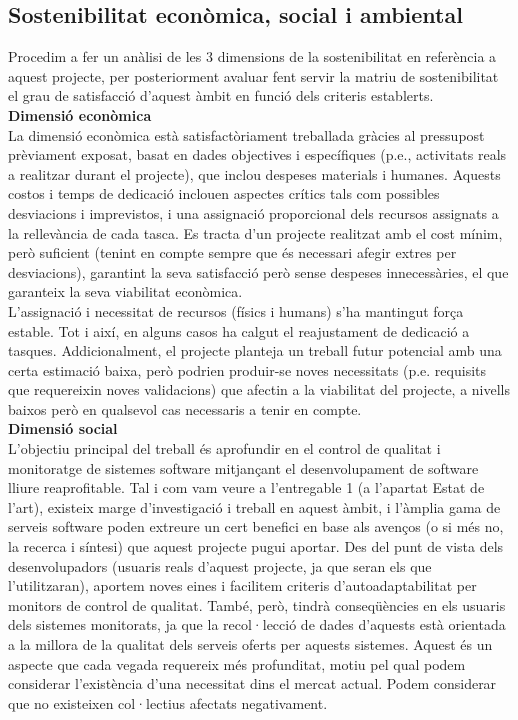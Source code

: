 \subsection{Sostenibilitat econòmica, social i ambiental}

Procedim a fer un anàlisi de les 3 dimensions de la sostenibilitat en referència a aquest projecte, per posteriorment avaluar fent servir la matriu de sostenibilitat el grau de satisfacció d’aquest àmbit en funció dels criteris establerts.\\

\noindent \textbf{\large Dimensió econòmica}\\

\noindent La dimensió econòmica està satisfactòriament treballada gràcies al pressupost prèviament exposat, basat en dades objectives i específiques (p.e., activitats reals a realitzar durant el projecte), que inclou despeses materials i humanes. Aquests costos i temps de dedicació inclouen aspectes crítics tals com possibles desviacions i imprevistos, i una assignació proporcional dels recursos assignats a la rellevància de cada tasca. Es tracta d’un projecte realitzat amb el cost mínim, però suficient (tenint en compte sempre que és necessari afegir extres per desviacions), garantint la seva satisfacció però sense despeses innecessàries, el que garanteix la seva viabilitat econòmica.\\

L'assignació i necessitat de recursos (físics i humans) s'ha mantingut força estable. Tot i així, en alguns casos ha calgut el reajustament de dedicació a tasques. Addicionalment, el projecte planteja un treball futur potencial amb una certa estimació baixa, però podrien produir-se noves necessitats (p.e. requisits que requereixin noves validacions) que afectin a la viabilitat del projecte, a nivells baixos però en qualsevol cas necessaris a tenir en compte.\\

\noindent \textbf{\large Dimensió social}\\

\noindent L’objectiu principal del treball és aprofundir en el control de qualitat i monitoratge de sistemes software mitjançant el desenvolupament de software lliure reaprofitable. Tal i com vam veure a l’entregable 1 (a l’apartat Estat de l’art), existeix marge d’investigació i treball en aquest àmbit, i l’àmplia gama de serveis software poden extreure un cert benefici en base als avenços (o si més no, la recerca i síntesi) que aquest projecte pugui aportar. Des del punt de vista dels desenvolupadors (usuaris reals d’aquest projecte, ja que seran els que l’utilitzaran), aportem noves eines i facilitem criteris d’autoadaptabilitat per monitors de control de qualitat. També, però, tindrà conseqüències en els usuaris dels sistemes monitorats, ja que la recol·lecció de dades d’aquests està orientada a la millora de la qualitat dels serveis oferts per aquests sistemes. Aquest és un aspecte que cada vegada requereix més profunditat, motiu pel qual podem considerar l’existència d’una necessitat dins el mercat actual. Podem considerar que no existeixen col·lectius afectats negativament.\\

